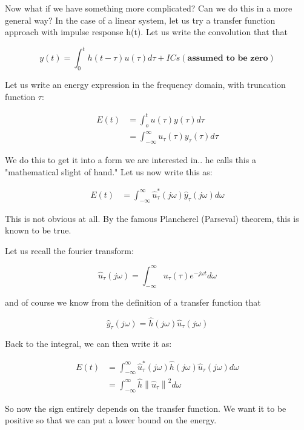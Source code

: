 \documentclass[11pt]{article}
\newcommand{\norm}[1]{\left\lVert#1\right\rVert}
\begin{document}
Now what if we have something more complicated? Can we do this in a more general way? In the case of a linear system, let us try a transfer function approach with impulse response h(t). Let us write the convolution that that

\begin{equation}
	y(t) = \int_0^t h(t-\tau)u(\tau)d\tau + ICs (\textbf{assumed to be zero})
\end{equation}

Let us write an energy expression in the frequency domain, with truncation function $\tau$:

\begin{align}
	E(t) &= \int_o^t u(\tau)y(\tau) d\tau \\
	&= \int_{-\infty}^\infty u_\tau (\tau) y_\tau (\tau) d\tau
\end{align}

We do this to get it into a form we are interested in.. he calls this a "mathematical slight of hand." Let us now write this as:

\begin{align}
	E(t) &= \int_{-\infty}^\infty \hat{u}_\tau^* (j\omega) \hat{y}_\tau (j\omega) d\omega
\end{align}

This is not obvious at all. By the famous Plancherel (Parseval) theorem, this is known to be true.

Let us recall the fourier transform:

\begin{equation}
	\hat{u}_\tau (j\omega) = \int_{-\infty}^\infty u_\tau (\tau) e^{-j\omega t} d\omega
\end{equation}

and of course we know from the definition of a transfer function that 

\begin{equation}
	\hat{y}_\tau (j\omega) = \hat{h} (j\omega) \hat{u}_\tau (j\omega)
\end{equation}

Back to the integral, we can then write it as: 

\begin{align}
	E(t) &= \int_{-\infty}^\infty \hat{u}_\tau^* (j\omega) \hat{h} (j\omega) \hat{u}_\tau (j\omega) d\omega \\
	& = \int_{-\infty}^\infty  \hat{h} \norm{\hat{u}_\tau}^2 d\omega
\end{align}

So now the sign entirely depends on the transfer function. We want it to be positive so that we can put a lower bound on the energy.
\end{document}
